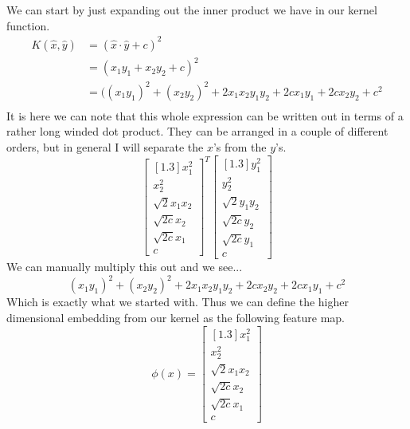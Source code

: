 \documentclass[11pt]{article}
\begin{document}
\begin{enumerate}
            We can start by just expanding out the inner product we have in our
            kernel function.
            \begin{align*}
                K(\hat{x},\hat{y}) &= (\hat{x} \cdot \hat{y} + c)^2 \\
                             &= (x_1y_1 + x_2y_2 + c)^2 \\
                             &= ((x_1y_1)^2 + (x_2y_2)^2 + 2x_1x_2y_1y_2 + 2cx_1y_1 + 2cx_2y_2 + c^2 \\
            \end{align*}
            It is here we can note that this whole expression can be written
            out in terms of a rather long winded dot product. They can be
            arranged in a couple of different orders, but in general I will
            separate the $x$'s from the $y$'s.
            \[
                \begin{bmatrix}[1.3]
                    x_1^2   \\
                    x_2^2   \\
                    \sqrt{2}x_1x_2  \\
                    \sqrt{2c}x_2    \\
                    \sqrt{2c}x_1    \\
                    c
                \end{bmatrix}^T
                \begin{bmatrix}[1.3]
                    y_1^2   \\
                    y_2^2   \\
                    \sqrt{2}y_1y_2  \\
                    \sqrt{2c}y_2    \\
                    \sqrt{2c}y_1    \\
                    c
                \end{bmatrix}
            \]            
            We can manually multiply this out and we see...
            \[
                (x_1y_1)^2 + (x_2y_2)^2 + 2x_1x_2y_1y_2 + 2cx_2y_2 + 2cx_1y_1 + c^2
            \]
            Which is exactly what we started with. Thus we can define the
            higher dimensional embedding from our kernel as the following
            feature map.
            \[
                \phi(x) = \begin{bmatrix}[1.3]
                            x_1^2   \\
                            x_2^2   \\
                            \sqrt{2}x_1x_2  \\
                            \sqrt{2c}x_2    \\
                            \sqrt{2c}x_1    \\
                            c
                       \end{bmatrix}
            \]
    \end{enumerate}
\end{document}
